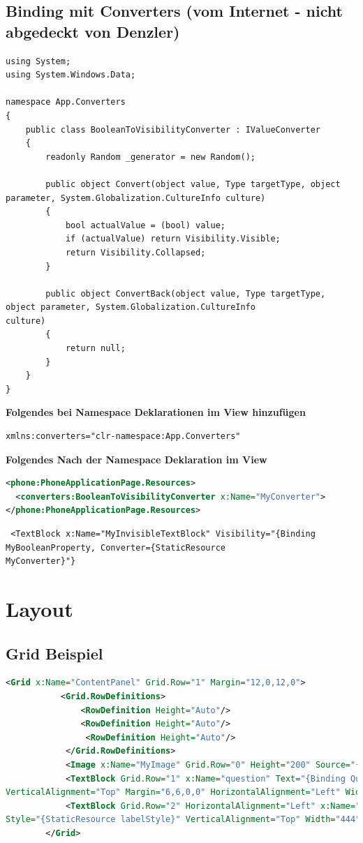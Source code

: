\documentclass[a4paper,10pt]{scrreprt}
\begin{document}
\section{Binding mit Converters (vom Internet - nicht abgedeckt von Denzler)}
\begin{lstlisting}
using System;
using System.Windows.Data;
 
namespace App.Converters
{
    public class BooleanToVisibilityConverter : IValueConverter
    {
        readonly Random _generator = new Random();
 
        public object Convert(object value, Type targetType, object parameter, System.Globalization.CultureInfo culture)
        {
            bool actualValue = (bool) value;
            if (actualValue) return Visibility.Visible;
            return Visibility.Collapsed;
        }
 
        public object ConvertBack(object value, Type targetType, object parameter, System.Globalization.CultureInfo 
culture)
        {
            return null;
        }
    }
}
\end{lstlisting}

\textbf{Folgendes bei Namespace Deklarationen im View hinzufügen} 
\begin{verbatim}
xmlns:converters="clr-namespace:App.Converters"
\end{verbatim}

\textbf{Folgendes Nach der Namespace Deklaration im View}
\begin{lstlisting}[language=xml]
<phone:PhoneApplicationPage.Resources>
  <converters:BooleanToVisibilityConverter x:Name="MyConverter">
</phone:PhoneApplicationPage.Resources>
\end{lstlisting}
\begin{lstlisting}
 <TextBlock x:Name="MyInvisibleTextBlock" Visibility="{Binding MyBooleanProperty, Converter={StaticResource 
MyConverter}"}
\end{lstlisting}

\chapter{Layout }
\section{Grid Beispiel}
\begin{lstlisting}[language=xml]
 <Grid x:Name="ContentPanel" Grid.Row="1" Margin="12,0,12,0">
           <Grid.RowDefinitions>
               <RowDefinition Height="Auto"/>
               <RowDefinition Height="Auto"/>
                <RowDefinition Height="Auto"/>
            </Grid.RowDefinitions>
            <Image x:Name="MyImage" Grid.Row="0" Height="200" Source="{Binding Image}" />
            <TextBlock Grid.Row="1" x:Name="question" Text="{Binding Question}" Style="{StaticResource labelStyle}" 
VerticalAlignment="Top" Margin="6,6,0,0" HorizontalAlignment="Left" Width="444" TextWrapping="Wrap" />
            <TextBlock Grid.Row="2" HorizontalAlignment="Left" x:Name="answer" Text="{Binding Answer}" 
Style="{StaticResource labelStyle}" VerticalAlignment="Top" Width="444" Margin="6,106,0,0" TextWrapping="Wrap" />
        </Grid>

\end{lstlisting}
\end{document}
